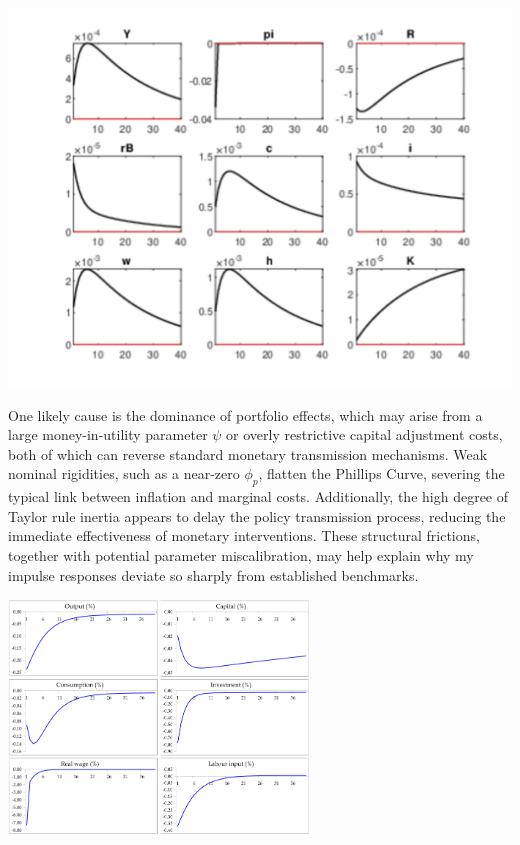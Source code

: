 \documentclass[11pt,preprint]{elsarticle}
\let\origfigure\figure
\let\endorigfigure\endfigure
\renewenvironment{figure}[1][2] {
    \expandafter\origfigure\expandafter[H]
} {
    \endorigfigure
}
\numberwithin{equation}{section}
\numberwithin{figure}{section}
\numberwithin{table}{section}
\begin{document}
\begin{figure}[H]
\includegraphics[width=0.7\linewidth]{data/IRF_trimmed} \caption{(mis-specified) impulse responses to a monetary policy shock in my New Keynesian model}\label{fig:unnamed-chunk-3}
\end{figure}

One likely cause is the dominance of portfolio effects, which may arise
from a large money-in-utility parameter \(\psi\) or overly restrictive
capital adjustment costs, both of which can reverse standard monetary
transmission mechanisms. Weak nominal rigidities, such as a near-zero
\(\phi_p\), flatten the Phillips Curve, severing the typical link
between inflation and marginal costs. Additionally, the high degree of
Taylor rule inertia appears to delay the policy transmission process,
reducing the immediate effectiveness of monetary interventions. These
structural frictions, together with potential parameter miscalibration,
may help explain why my impulse responses deviate so sharply from
established benchmarks.

\begin{figure}
\centering
\includegraphics[width=0.6\textwidth,height=0.4\textheight]{data/dePaoli_IRF.png}
\caption{De Paoli, Scott \& Weeken ()'s
impulse responses in the sticky-price model following a monetary policy
shock}
\end{figure}
\end{document}
